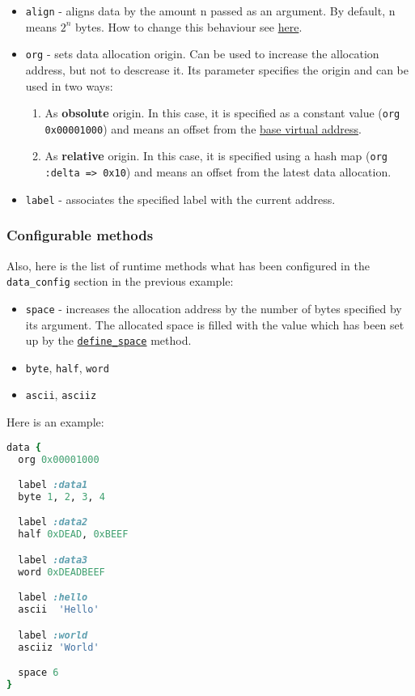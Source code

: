 \documentclass[oneside,final,12pt]{extreport}
\begin{document}
\begin{itemize}
\item \texttt{align} - aligns data by the amount n passed as an argument. By default, n means
      $2^n$ bytes. How to change this behaviour see \hyperref[managing_address_alignment]{here}.

\item \texttt{org} - sets data allocation origin. Can be used to increase the allocation address,
      but not to descrease it. Its parameter specifies the origin and can be used in two ways:
      \begin{enumerate}
      \item As \textbf{obsolute} origin. In this case, it is specified as a constant value
            (\texttt{org 0x00001000}) and means an offset from the
            \hyperref[base_virtual_address]{base virtual address}.
      \item As \textbf{relative} origin. In this case, it is specified using a hash map
            (\texttt{org :delta => 0x10}) and means an offset from the latest data allocation.
      \end{enumerate}

\item \texttt{label} - associates the specified label with the current address.  
\end{itemize}

\subsubsection{Configurable methods}

Also, here is the list of runtime methods what has been configured in the \texttt{data{\_}config}
section in the previous example:

\begin{itemize}
\item \texttt{space} - increases the allocation address by the number of bytes specified by
      its argument. The allocated space is filled with the value which has been set up by
      the \hyperref[define_space]{\texttt{define{\_}space}} method.
\item \texttt{byte}, \texttt{half}, \texttt{word}
\item \texttt{ascii}, \texttt{asciiz}
\end{itemize}

Here is an example:

\begin{lstlisting}[language=ruby]
data {
  org 0x00001000

  label :data1
  byte 1, 2, 3, 4

  label :data2
  half 0xDEAD, 0xBEEF

  label :data3
  word 0xDEADBEEF

  label :hello
  ascii  'Hello'

  label :world
  asciiz 'World'

  space 6
}
\end{lstlisting}
\end{document}
